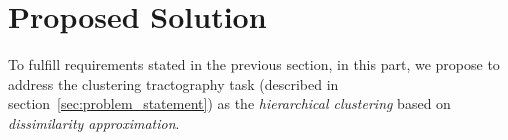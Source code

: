 \section{Proposed Solution}
\label{sec:solution}
To fulfill requirements stated in the previous section, in this part, we propose to address the clustering tractography task (described in section~\ref{sec:problem_statement}) as the \textit{hierarchical clustering} based on \textit{dissimilarity approximation}. 

